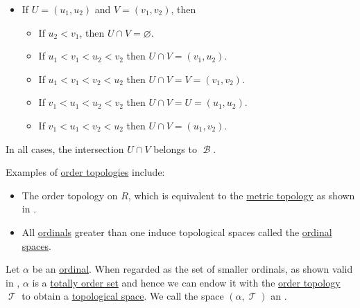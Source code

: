 \begin{defproof}
\begin{itemize}
    \item If \( U = (u_1, u_2) \) and \( V = (v_1, v_2) \), then
    \begin{itemize}
      \item If \( u_2 < v_1 \), then \( U \cap V = \varnothing \).
      \item If \( u_1 < v_1 < u_2 < v_2 \) then \( U \cap V = (v_1, u_2) \).
      \item If \( u_1 < v_1 < v_2 < u_2 \) then \( U \cap V = V = (v_1, v_2) \).
      \item If \( v_1 < u_1 < u_2 < v_2 \) then \( U \cap V = U = (u_1, u_2) \).
      \item If \( v_1 < u_1 < v_2 < u_2 \) then \( U \cap V = (u_1, v_2) \).
    \end{itemize}
  \end{itemize}

  In all cases, the intersection \( U \cap V \) belongs to \( \mscrB \).
\end{defproof}

\begin{example}\label{ex:def:order_topology}
  Examples of \hyperref[def:order_topology]{order topologies} include:
  \begin{itemize}
    \item The order topology on \( R \), which is equivalent to the \hyperref[def:metric_topology]{metric topology} as shown in .

    \item All \hyperref[def:ordinal]{ordinals} greater than one induce topological spaces called the \hyperref[def:ordinal_space]{ordinal spaces}.
  \end{itemize}
\end{example}

\begin{definition}\label{def:ordinal_space}
  Let \( \alpha \) be an \hyperref[def:ordinal]{ordinal}. When regarded as the set of smaller ordinals, as shown valid in , \( \alpha \) is a \hyperref[def:totally_ordered_set]{totally order set} and hence we can endow it with the \hyperref[def:order_topology]{order topology} \( \mscrT \) to obtain a \hyperref[def:topological_space]{topological space}. We call the space \( (\alpha, \mscrT) \) an .
\end{definition}

